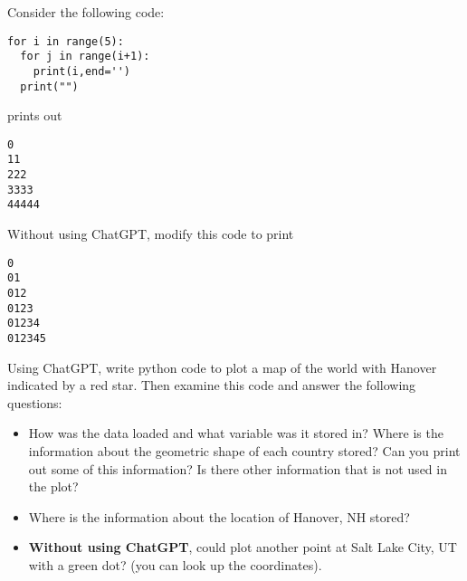  \begin{exercise}
 
 

Consider the following code:

\begin{Verbatim}
for i in range(5):
  for j in range(i+1):
    print(i,end='')
  print("")
\end{Verbatim}
prints out
\begin{Verbatim}
0
11
222
3333
44444
\end{Verbatim}
Without using ChatGPT, modify this code to print
\begin{Verbatim}
0
01
012
0123
01234
012345
\end{Verbatim}
\end{exercise}


 \begin{exercise}
 Using ChatGPT, write python code to plot a map of the world with Hanover indicated by a red star. 
 Then examine this code and answer the following questions: 
 \begin{itemize}
 \item How was the data loaded and what variable was it stored in?  Where is the information about the geometric shape of each country stored? Can you print out some of this information? Is there other information that is not used in the plot? 
 \item Where is the information about the location of Hanover, NH stored? 
 \item {\bf Without using ChatGPT}, could plot another point at Salt Lake City, UT with a green dot? (you can look up the coordinates). 
 \end{itemize}
 
 \end{exercise}

